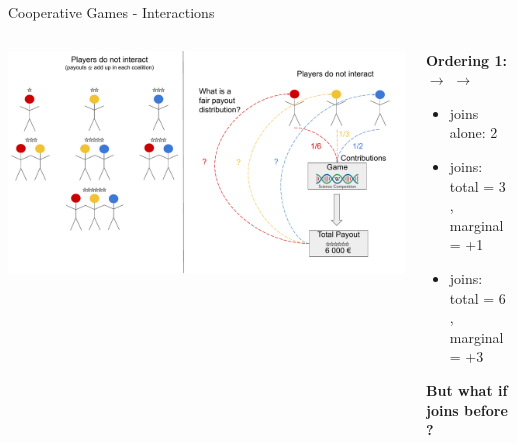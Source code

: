 \documentclass[11pt,compress,t,notes=noshow, aspectratio=169, xcolor=table]{beamer}
\begin{document}
\begin{frame}{Cooperative Games - Interactions}

\begin{columns}[T, totalwidth=\linewidth]
\begin{column}{0.4\textwidth}
\includegraphics[page=3, width = \textwidth, trim=0px 50px 420px 50px, clip]{figure/Shapley.pdf}
    \end{column}
    \begin{column}{0.5\textwidth}
        \textbf{Ordering 1:} \textcolor{playeryellow}{} $\rightarrow$ \textcolor{playerblue}{} $\rightarrow$ \textcolor{playerred}{}
\begin{itemize}
  \item[\textcolor{playeryellow}{\scalebox{1}{\ding{108}}}] joins alone: 2 
  \item[\textcolor{playerblue}{\scalebox{1}{\ding{108}}}] joins: total = 3 , marginal = +1
  \item[\textcolor{playerred}{\scalebox{1}{\ding{108}}}] joins: total = 6 , marginal = +3
\end{itemize}

\vspace{0.25em}

\textbf{But what if \textcolor{playerred}{} joins before \textcolor{playerblue}{}?}

\vspace{0.25em}


\end{column}
\end{columns}
\end{frame}
\end{document}
